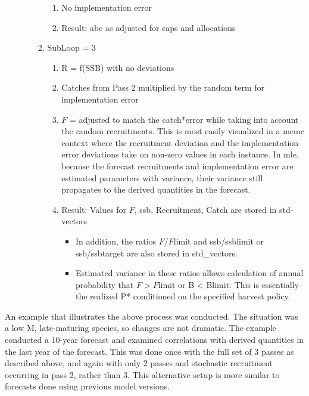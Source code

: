 \begin{enumerate}
\begin{enumerate}
\begin{enumerate}
\begin{enumerate}
				\item No implementation error
				\item Result: \gls{abc} as adjusted for caps and allocations
			\end{enumerate}
			\item SubLoop = 3
			\begin{enumerate}
				\item R = f(SSB) with no deviations
				\item Catches from Pass 2 multiplied by the random term for implementation error
				\item $F$ = adjusted to match the catch*error while taking into account the random recruitments. This is most easily visualized in a \gls{mcmc} context where the recruitment deviation and the implementation error deviations take on non-zero values in each instance. In \gls{mle}, because the forecast recruitments and implementation error are estimated parameters with variance, their variance still propagates to the derived quantities in the forecast.
				\item Result: Values for $F$, \gls{ssb}, Recruitment, Catch are stored in std-vectors
				\begin{itemize}
					\item In addition, the ratios $F$/$F\text{limit}$ and \gls{ssb}/\gls{ssb}limit or \gls{ssb}/\gls{ssb}target are also stored in std\_vectors.
					\item Estimated variance in these ratios allows calculation of annual probability that $F > F\text{limit}$ or B < Blimit. This is essentially the realized P* conditioned on the specified harvest policy.
				\end{itemize}
			\end{enumerate}
		\end{enumerate}
	\end{enumerate}
\end{enumerate}

An example that illustrates the above process was conducted. The situation was a low M, late-maturing species, so changes are not dramatic. The example conducted a 10-year forecast and examined correlations with derived quantities in the last year of the forecast. This was done once with the full set of 3 passes as described above, and again with only 2 passes and stochastic recruitment occurring in pass 2, rather than 3. This alternative setup is more similar to forecasts done using previous model versions.


